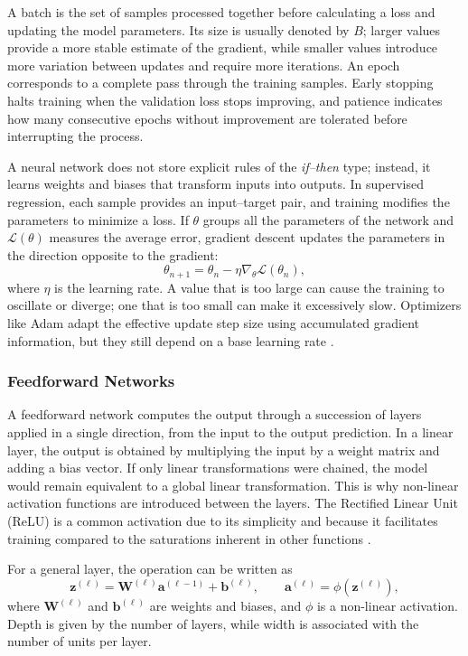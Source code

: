 A batch is the set of samples processed together before calculating a loss and updating the model parameters. Its size is usually denoted by $B$; larger values provide a more stable estimate of the gradient, while smaller values introduce more variation between updates and require more iterations. An epoch corresponds to a complete pass through the training samples. Early stopping halts training when the validation loss stops improving, and patience indicates how many consecutive epochs without improvement are tolerated before interrupting the process.

A neural network does not store explicit rules of the \textit{if--then} type; instead, it learns weights and biases that transform inputs into outputs. In supervised regression, each sample provides an input--target pair, and training modifies the parameters to minimize a loss. If $\theta$ groups all the parameters of the network and $\mathcal{L}(\theta)$ measures the average error, gradient descent updates the parameters in the direction opposite to the gradient:
\[
  \theta_{n+1}=\theta_n-\eta\nabla_\theta\mathcal{L}(\theta_n),
\]
where $\eta$ is the learning rate. A value that is too large can cause the training to oscillate or diverge; one that is too small can make it excessively slow. Optimizers like Adam adapt the effective update step size using accumulated gradient information, but they still depend on a base learning rate \cite{kingma2015adam}.

\subsubsection{Feedforward Networks}

A feedforward network computes the output through a succession of layers applied in a single direction, from the input to the output prediction. In a linear layer, the output is obtained by multiplying the input by a weight matrix and adding a bias vector. If only linear transformations were chained, the model would remain equivalent to a global linear transformation. This is why non-linear activation functions are introduced between the layers. The Rectified Linear Unit (ReLU) is a common activation due to its simplicity and because it facilitates training compared to the saturations inherent in other functions \cite{nair2010relu}.

For a general layer, the operation can be written as
\[
  \bm{z}^{(\ell)}=\bm{W}^{(\ell)}\bm{a}^{(\ell-1)}+\bm{b}^{(\ell)},\qquad
  \bm{a}^{(\ell)}=\phi(\bm{z}^{(\ell)}),
\]
where $\bm{W}^{(\ell)}$ and $\bm{b}^{(\ell)}$ are weights and biases, and $\phi$ is a non-linear activation. Depth is given by the number of layers, while width is associated with the number of units per layer.

